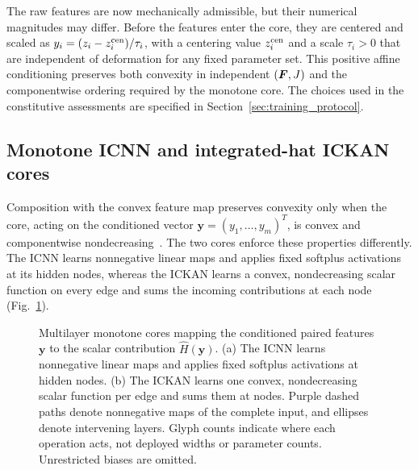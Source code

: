 The raw features are now mechanically admissible, but their numerical magnitudes may differ. Before the features enter the core, they are centered and scaled as $y_i=(z_i-z_i^{\rm cen})/\tau_i$, with a centering value $z_i^{\rm cen}$ and a scale $\tau_i>0$ that are independent of deformation for any fixed parameter set. This positive affine conditioning preserves both convexity in independent $(\bm F,J)$ and the componentwise ordering required by the monotone core. The choices used in the constitutive assessments are specified in Section~\ref{sec:training_protocol}.

\subsection{Monotone ICNN and integrated-hat ICKAN cores}
\label{sec:convex_cores}
Composition with the convex feature map preserves convexity only when the core, acting on the conditioned vector $\bm y=(y_1,\ldots,y_m)^T$, is convex and componentwise nondecreasing~\cite{klein2022,linden2023}. The two cores enforce these properties differently. The ICNN learns nonnegative linear maps and applies fixed softplus activations at its hidden nodes, whereas the ICKAN learns a convex, nondecreasing scalar function on every edge and sums the incoming contributions at each node (Fig.~\ref{fig:convex_core_architectures}).

\begin{figure}[tbp]
 \centering
 \caption{Multilayer monotone cores mapping the conditioned paired features $\bm y$ to the scalar contribution $\widehat H(\bm y)$. (a) The ICNN learns nonnegative linear maps and applies fixed softplus activations at hidden nodes. (b) The ICKAN learns one convex, nondecreasing scalar function per edge and sums them at nodes. Purple dashed paths denote nonnegative maps of the complete input, and ellipses denote intervening layers. Glyph counts indicate where each operation acts, not deployed widths or parameter counts. Unrestricted biases are omitted.}
 \label{fig:convex_core_architectures}
\end{figure}


